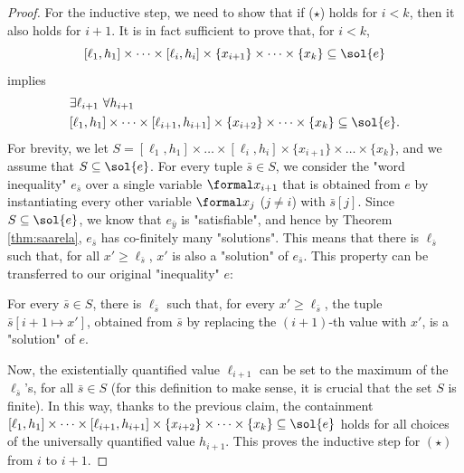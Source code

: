\documentclass{theoretics}
\begin{document}
\begin{proof}
For the inductive step, we need to show that 
if ($\star$) holds for $i<k$, then it also holds for $i+1$.
It is in fact sufficient to prove that, for $i<k$,
\[
  [\ell_1,h_1]\times\cdots\times[\ell_i,h_i]\times
  \{x_{i+1}\}\times\dots\times\{x_k\} 
  \subseteq \sol{e}
\]
implies
\begin{align*}
  & \exists \ell_{i+1} ~ \forall h_{i+1} \\
  & [\ell_1,h_1]\times\cdots\times[\ell_{i+1},h_{i+1}]\times
    \{x_{i+2}\}\times\dots\times\{x_k\} 
    \subseteq \sol{e}.
\end{align*}
For brevity, we let 
$S = [\ell_1,h_1]\times\dots\times[\ell_i,h_i]\times    
     \{x_{i+1}\}\times\dots\times\{x_k\}$,
and we assume that $S\subseteq \sol{e}$.
For every tuple $\bar s\in S$, we consider the "word inequality" 
$e_{\bar s}$ over a single
variable $\formal x_{i+1}$ that is obtained from $e$ by instantiating every other variable
$\formal x_j$ ($j\neq i$) with $\bar s[j]$.
Since $S\subseteq\sol{e}$, we know that $e_{\bar y}$ is "satisfiable", and hence
by Theorem \ref{thm:saarela}, $e_{\bar s}$ has co-finitely many "solutions".
This means that there is $\ell_{\bar s}$ such that, for all $x'\ge \ell_{\bar s}$, 
$x'$ is also a "solution" of $e_{\bar s}$.
This property can be transferred to our original "inequality" $e$:

\begin{claim*}\label{claim:saarela3}
For every $\bar s\in S$, there is $\ell_{\bar s}$ such that,
for every $x'\ge \ell_{\bar s}$, the tuple $\bar s[i+1 \mapsto x']$, 
obtained from $\bar s$ by replacing the $(i+1)$-th value with $x'$,
is a "solution" of $e$.
\end{claim*}

Now, 
the existentially quantified value $\ell_{i+1}$ 
can be set to
the maximum of the $\ell_{\bar s}$'s, for all $\bar s\in S$
(for this definition to make sense, it is crucial that the set $S$ is finite).
In this way, thanks to the previous claim, the containment 
$[\ell_1,h_1]\times\cdots\times[\ell_{i+1},h_{i+1}]\times\{x_{i+2}\}\times\dots\times\{x_k\} \subseteq \sol{e}$
holds for all choices of the universally quantified value $h_{i+1}$.
This proves the inductive step for $(\star)$ from $i$ to $i+1$.
\end{proof}
\end{document}
